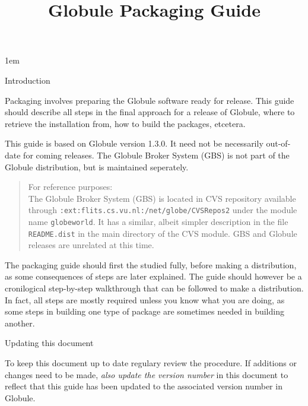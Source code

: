 \documentclass[10pt,twoside]{article}
\title{Globule Packaging Guide}
\date{Version 1.3.0
  \ifhevea \begin{rawhtml}</H3> 
<H3 ALIGN=center>\end{rawhtml} \else \\ \fi
  \ahrefurl{http://www.globule.org/}}
\author{\ahref{\url{http://www.halderen.net/}}{Berry~van~Halderen}}
\makeatletter
\def\section{\@startsection{section}{1}
{\z@}{-2.5ex plus -0.5ex minus -0.1ex}{0.5ex plus 0.1ex}{\large\bf}}
\def\subsection{\@startsection{subsection}{2}
{\z@}{-2.25ex plus -0.3ex minus -0.2ex}{0.05ex plus 0.05ex}{\normalsize\bf}}
\makeatother
\begin{document}
\maketitle

\tableofcontents
\cleardoublepage

\parindent 0pt
\parskip 1em

\section{Introduction}

Packaging involves preparing the Globule software ready for release.  This
guide should describe all steps in the final approach for a release of
Globule, where to retrieve the installation from, how to build the packages,
etcetera.

This guide is based on Globule version 1.3.0.  It need not be necessarily
out-of-date for coming releases.  The Globule Broker System (GBS) is not part
of the Globule distribution, but is maintained seperately.

\begin{quote}\scriptsize
For reference purposes: \\
The Globule Broker System (GBS) is located in CVS repository available through
\newline
\verb!:ext:flits.cs.vu.nl:/net/globe/CVSRepos2! under the module name
\texttt{globeworld}.  It has a similar, albeit simpler
description in the file \texttt{README.dist} in the main
directory of the CVS module.  GBS and Globule releases are unrelated at this
time.
\end{quote}

The packaging guide should first the studied fully, before making a
distribution, as some consequences of steps are later explained.  The guide
should however be a cronilogical step-by-step walkthrough that can be followed
to make a distribution.  In fact, all steps are mostly required unless you
know what you are doing, as some steps in building one type of package are
sometimes needed in building another.

\subsection{Updating this document}

To keep this document up to date regulary review the procedure.  If additions
or changes need to be made, \emph{also update the version number} in this
document to reflect that this guide has been updated to the associated version
number in Globule.
\end{document}

